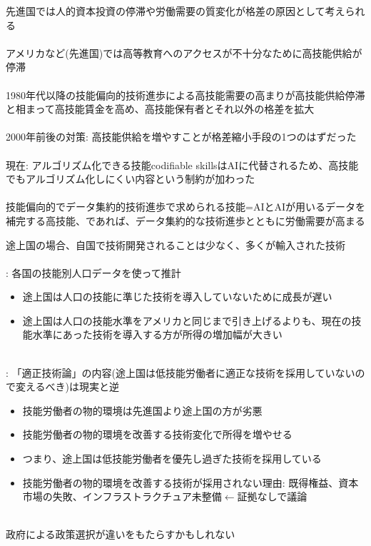 \begin{frame}{}
先進国では人的資本投資の停滞や労働需要の質変化が格差の原因として考えられる\\~\\
\pause
アメリカなど(先進国)では高等教育へのアクセスが不十分なために高技能供給が停滞\\~\\
\pause
1980年代以降の技能偏向的技術進歩による高技能需要の高まりが高技能供給停滞と相まって高技能賃金を高め、高技能保有者とそれ以外の格差を拡大\\~\\
\pause
2000年前後の対策: 高技能供給を増やすことが格差縮小手段の1つのはずだった\\~\\
\pause
現在: アルゴリズム化できる技能codifiable skillsはAIに代替されるため、高技能でもアルゴリズム化しにくい内容という制約が加わった\\~\\
\pause
技能偏向的でデータ集約的技術進歩で求められる技能=AIとAIが用いるデータを補完する高技能、であれば、データ集約的な技術進歩とともに労働需要が高まる
\end{frame}

\begin{frame}{}
途上国の場合、自国で技術開発されることは少なく、多くが輸入された技術\\~\\
\pause
\citet{JerzmanowskiTamura2019}: 各国の技能別人口データを使って推計
\begin{itemize}
\vspace{1.0ex}\setlength{\itemsep}{1.0ex}\setlength{\baselineskip}{12pt}
\pause
\item	途上国は人口の技能に準じた技術を導入していないために成長が遅い
\pause
\item	途上国は人口の技能水準をアメリカと同じまで引き上げるよりも、現在の技能水準にあった技術を導入する方が所得の増加幅が大きい\\~\\
\end{itemize}
\pause
\citet{Okoye2016}: 「適正技術論」の内容(途上国は低技能労働者に適正な技術を採用していないので変えるべき)は現実と逆
\begin{itemize}
\vspace{1.0ex}\setlength{\itemsep}{1.0ex}\setlength{\baselineskip}{12pt}
\pause
\item	技能労働者の物的環境は先進国より途上国の方が劣悪
\pause
\item	技能労働者の物的環境を改善する技術変化で所得を増やせる
\pause
\item	つまり、途上国は低技能労働者を優先し過ぎた技術を採用している
\pause
\item	技能労働者の物的環境を改善する技術が採用されない理由: 既得権益、資本市場の失敗、インフラストラクチュア未整備$\leftarrow$証拠なしで議論\\~\\
\end{itemize}
\pause
政府による政策選択が違いをもたらすかもしれない
\end{frame}


